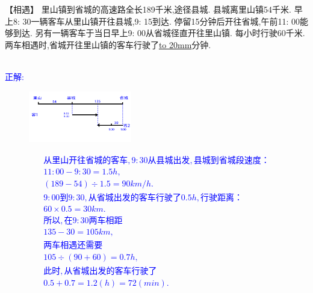 \item {
    【相遇】
    里山镇到省城的高速路全长189千米,途径县城. 县城离里山镇54千米. 早上8: 30一辆客车从里山镇开往县城,9: 15到达. 停留15分钟后开往省城,午前11: 00能够到达. 另有一辆客车于当日早上9: 00从省城径直开往里山镇. 每小时行驶60千米. 两车相遇时,省城开往里山镇的客车行驶了\underline{\hbox to 20mm{}}分钟.
    \ifshowSolution 
        \fangsong{}\textcolor{blue}{
            \\正解: \\
            \begin{figure}[H] 
                \centering
                \includegraphics[width=0.4\textwidth]{./pics/Chapter_3/seikai_1.png}
            \end{figure}
            \begin{gather*}
                从里山开往省城的客车,9:30从县城出发,县城到省城段速度：\\
                    11:00 - 9:30 = 1.5 h,\\
                    (189-54)\div 1.5=90 km/h.\\
                9:00到9:30, 从省城出发的客车行驶了0.5h,行驶距离：\\
                    60\times 0.5 = 30km.\\
                所以,在9:30两车相距\\
                    135 - 30 = 105 km,\\
                两车相遇还需要\\
                105\div (90+60) = 0.7h,\\
                此时,从省城出发的客车行驶了\\
                0.5 + 0.7 = 1.2(h) = 72(min).
            \end{gather*}
        }
    \else
        \vspace{2cm}
    \fi
}

